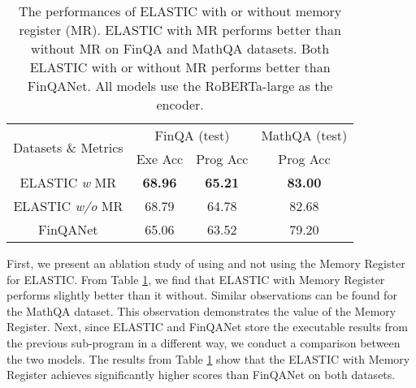 \documentclass{article}
\begin{document}
\begin{table}[tbph!]
\caption{The performances of ELASTIC with or without memory register (MR). ELASTIC with MR performs better than without MR on FinQA and MathQA datasets. Both ELASTIC with or without MR performs better than FinQANet. All models use the RoBERTa-large as the encoder.\\}
\label{tab:Cache_Comp}
\centering
\begin{tabular}{@{}cccc@{}}
\toprule
\multicolumn{1}{c}{\multirow{2}{*}{Datasets \& Metrics}} & \multicolumn{2}{c}{FinQA (test)} & MathQA (test) \\ \cmidrule(l){2-4} 
\multicolumn{1}{c}{} & Exe Acc        & Prog Acc       & Prog Acc       \\ \midrule
ELASTIC \textit{w} MR         & \textbf{68.96} & \textbf{65.21} & \textbf{83.00} \\ \midrule
ELASTIC \textit{w/o} MR       & 68.79          & 64.78          & 82.68          \\ \midrule
FinQANet             & 65.06          & 63.52          & 79.20          \\ \bottomrule
\end{tabular}
\end{table}

First, we present an ablation study of using and not using the Memory Register for ELASTIC. From Table \ref{tab:Cache_Comp}, we find that ELASTIC with Memory Register performs slightly better than it without. Similar observations can be found for the MathQA dataset. This observation demonstrates the value of the Memory Register. Next, since ELASTIC and FinQANet store the executable results from the previous sub-program in a different way, we conduct a comparison between the two models. The results from Table \ref{tab:Cache_Comp} show that the ELASTIC with Memory Register achieves significantly higher scores than FinQANet on both datasets.
\end{document}
